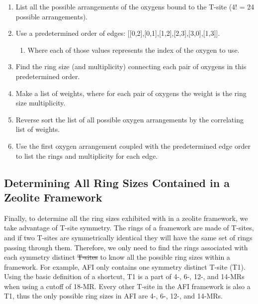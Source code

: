 \documentclass[preprint,numrefs,noinfo,sort&compress]{elsarticle}
\providecommand{\DIFadd}[1]{{\protect\color{blue}\uwave{#1}}} %
\providecommand{\DIFdel}[1]{{\protect\color{red}\sout{#1}}}                      %
\providecommand{\DIFaddbegin}{} %
\providecommand{\DIFaddend}{} %
\providecommand{\DIFdelbegin}{} %
\providecommand{\DIFdelend}{} %
\newcommand{\DIFscaledelfig}{0.5}
\newlength{\DIFdelgraphicswidth} %
\newlength{\DIFdelgraphicsheight} %
\newcommand{\DIFaddincludegraphics}[2][]{{\color{blue}\fbox{\DIFOincludegraphics[#1]{#2}}}} %
\newcommand{\DIFdelincludegraphics}[2][]{%
\sbox{\DIFdelgraphicsbox}{\DIFOincludegraphics[#1]{#2}}%
\settoboxwidth{\DIFdelgraphicswidth}{\DIFdelgraphicsbox} %
\settoboxtotalheight{\DIFdelgraphicsheight}{\DIFdelgraphicsbox} %
\scalebox{\DIFscaledelfig}{%
\parbox[b]{\DIFdelgraphicswidth}{\usebox{\DIFdelgraphicsbox}\\[-\baselineskip] \rule{\DIFdelgraphicswidth}{0em}}\llap{\resizebox{\DIFdelgraphicswidth}{\DIFdelgraphicsheight}{%
\setlength{\unitlength}{\DIFdelgraphicswidth}%
\begin{picture}(1,1)%
\thicklines\linethickness{2pt} %
{\color[rgb]{1,0,0}\put(0,0){\framebox(1,1){}}}%
{\color[rgb]{1,0,0}\put(0,0){\line( 1,1){1}}}%
{\color[rgb]{1,0,0}\put(0,1){\line(1,-1){1}}}%
\end{picture}%
}\hspace*{3pt}}} %
} %
\DeclareRobustCommand{\DIFaddbegin}{\DIFOaddbegin \let\includegraphics\DIFaddincludegraphics} %
\DeclareRobustCommand{\DIFaddend}{\DIFOaddend \let\includegraphics\DIFOincludegraphics} %
\DeclareRobustCommand{\DIFdelbegin}{\DIFOdelbegin \let\includegraphics\DIFdelincludegraphics} %
\DeclareRobustCommand{\DIFdelend}{\DIFOaddend \let\includegraphics\DIFOincludegraphics} %
\begin{document}
\begin{enumerate}
\item List all the possible arrangements of the oxygens bound to the T-site (4! = 24 possible arrangements).
\item Use a predetermined order of edges: [[0,2],[0,1],[1,2],[2,3],[3,0],[1,3]].
\begin{enumerate}
\item Where each of those values represents the index of the oxygen to use.
\end{enumerate}
\item Find the ring size (and multiplicity) connecting each pair of oxygens in this predetermined order.
\item Make a list of weights, where for each pair of oxygens the weight is the ring size \texttimes{} multiplicity.
\item Reverse sort the list of all possible oxygen arrangements by the correlating list of weights.
\item Use the first oxygen arrangement coupled with the predetermined edge order to list the rings and multiplicity for each edge.
\end{enumerate}

\subsection{Determining All Ring Sizes Contained in a Zeolite Framework}
\DIFdelbegin %
\DIFdelend \DIFaddbegin \label{sec:org6a29aa7}
\DIFaddend 



Finally, to determine all the ring sizes exhibited with in a zeolite framework, we take advantage of T-site symmetry. The rings of a framework are made of T-sites, and if two T-sites are symmetrically identical they will have the same set of rings passing through them. Therefore, we only need to find the rings associated with each symmetry distinct \DIFdelbegin \DIFdel{T-sites }\DIFdelend \DIFaddbegin \DIFadd{T-site }\DIFaddend to know all the possible ring sizes within a framework. For example, AFI only contains one symmetry distinct T-site (T1). Using the basic definition of a shortcut, T1 is a part of 4-, 6-, 12-, and 14-MRs when using a cutoff of 18-MR. Every other T-site in the AFI framework is also a T1, thus the only possible ring sizes in AFI are 4-, 6-, 12-, and 14-MRs.
\end{document}
